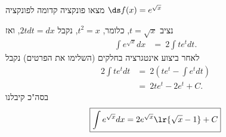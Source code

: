 מצאו פונקציה קדומה לפונקציה
$\ds f(x)=e^{\sqrt{x}}$
\begin{solbox}
נציב $t=\sqrt{x}$,
כלומר,
$t^2=x$,
נקבל
$2tdt=dx$,
ואז
\begin{align*}
    \int e^{\sqrt{x}}dx&=\ 2\int te^tdt.
\end{align*}
לאחר ביצוע אינטגרציה בחלקים (השלימו את הפרטים) נקבל
\begin{align*}
    2\int te^tdt&=\ 2\left(te^t-\int e^tdt\right)\\
    &=\ 2te^t-2e^t+C.
\end{align*}
בסה"כ קיבלנו
\begin{align*}
\boxed{\int e^{\sqrt{x}}dx=2e^{\sqrt{x}}\lr{\sqrt{x}-1}+C}
\end{align*}
\end{solbox}

